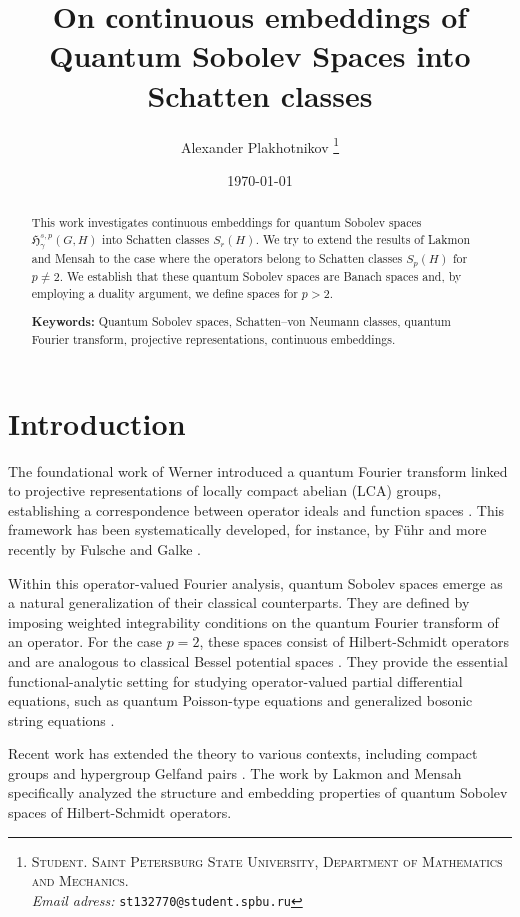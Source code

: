 \documentclass[11pt,a4paper]{article}
\title{\textbf{On сontinuous embeddings of Quantum Sobolev Spaces into Schatten classes}}
\author{Alexander Plakhotnikov \footnote{
\textsc{Student. Saint Petersburg State University, Department of Mathematics and Mechanics.} \\
\textit{Email adress:} \texttt{st132770@student.spbu.ru}}}
\date{\today}
\theoremstyle{definition}
\begin{document}
\maketitle

\begin{abstract}
This work investigates continuous embeddings for quantum Sobolev spaces $\mathfrak{H}_\gamma^{s,p}(G,H)$ into Schatten classes $S_r(H)$. We try to extend the results of Lakmon and Mensah to the case where the operators belong to Schatten classes $S_p(H)$ for $p \neq 2$. We establish that these quantum Sobolev spaces are Banach spaces and, by employing a duality argument, we define spaces for $p>2$. 
\bigskip

\noindent\textbf{Keywords:} Quantum Sobolev spaces, Schatten--von Neumann classes, quantum Fourier transform, projective representations, continuous embeddings.
\end{abstract}

\section{Introduction}

The foundational work of Werner introduced a quantum Fourier transform linked to projective representations of locally compact abelian (LCA) groups, establishing a correspondence between operator ideals and function spaces \cite{Werner1984}. This framework has been systematically developed, for instance, by F\"uhr \cite{Fuehr2005} and more recently by Fulsche and Galke \cite{FulscheGalke2025}.

Within this operator-valued Fourier analysis, quantum Sobolev spaces emerge as a natural generalization of their classical counterparts. They are defined by imposing weighted integrability conditions on the quantum Fourier transform of an operator. For the case $p=2$, these spaces consist of Hilbert-Schmidt operators and are analogous to classical Bessel potential spaces \cite{LakmonMensah2025}. They provide the essential functional-analytic setting for studying operator-valued partial differential equations, such as quantum Poisson-type equations and generalized bosonic string equations \cite{GorkaKostrzewaReyes2015, Mensah2021}.

Recent work has extended the theory to various contexts, including compact groups and hypergroup Gelfand pairs \cite{BatakaEgweMensah2024, KumarKumar2023}. The work by Lakmon and Mensah \cite{LakmonMensah2025} specifically analyzed the structure and embedding properties of quantum Sobolev spaces of Hilbert-Schmidt operators.
\end{document}
